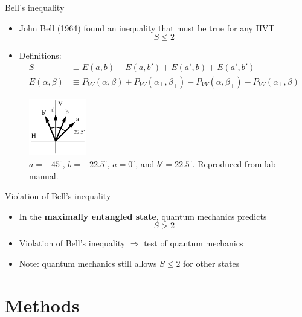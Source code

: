 \documentclass{../talk}
\renewcommand{\deg}{^\circ}
\begin{document}
\begin{frame}{Bell's inequality}
  \begin{itemize}
    \item John Bell (1964) found an inequality that must be true for any HVT
      \begin{equation}\label{eq:Bell-inequality}
        S \leq 2
      \end{equation}
    \item Definitions:
      \begin{align}
        S &\equiv E(a,b) - E(a,b') + E(a',b) + E(a',b') \\
        E(\alpha,\beta) &\equiv P_{VV}(\alpha,\beta) + P_{VV}(\alpha_\perp,\beta_\perp) - P_{VV}(\alpha,\beta_\perp) - P_{VV}(\alpha_\perp,\beta)
      \end{align}
  \end{itemize}
  \begin{figure}
    \centering
    \includegraphics[width=0.225\textwidth]{assets/angles.png}
    \caption{$a = -45\deg$, $b = -22.5\deg$, $a = 0\deg$, and $b' = 22.5\deg$. Reproduced from lab manual.}
  \end{figure}
\end{frame}

\begin{frame}{Violation of Bell's inequality}
  \begin{itemize}
    \item In the {\bf maximally entangled state}, quantum mechanics predicts
      \begin{equation}
        S > 2
      \end{equation}
    \item Violation of Bell's inequality $\Rightarrow$ test of quantum mechanics
    \item Note: quantum mechanics still allows $S \leq 2$ for other states
  \end{itemize}
\end{frame}

\section{Methods}
\end{document}
